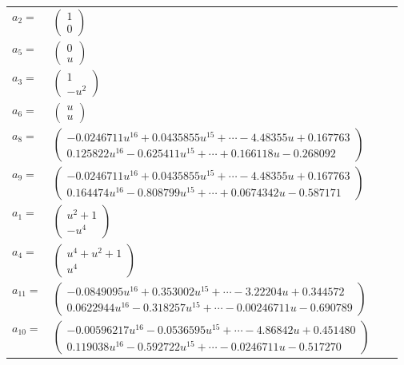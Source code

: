 \documentclass[1p]{elsarticle_modified}
\theoremstyle{definition}
\begin{document}
\begin{tabular}{m{7pt} m{180pt} m{7pt} m{180pt} }
\flushright $a_{2}=$&$\begin{pmatrix}1\\0\end{pmatrix}$ \\
\flushright $a_{5}=$&$\begin{pmatrix}0\\u\end{pmatrix}$ \\
\flushright $a_{3}=$&$\begin{pmatrix}1\\- u^2\end{pmatrix}$ \\
\flushright $a_{6}=$&$\begin{pmatrix}u\\u\end{pmatrix}$ \\
\flushright $a_{8}=$&$\begin{pmatrix}-0.0246711 u^{16}+0.0435855 u^{15}+\cdots-4.48355 u+0.167763\\0.125822 u^{16}-0.625411 u^{15}+\cdots+0.166118 u-0.268092\end{pmatrix}$ \\
\flushright $a_{9}=$&$\begin{pmatrix}-0.0246711 u^{16}+0.0435855 u^{15}+\cdots-4.48355 u+0.167763\\0.164474 u^{16}-0.808799 u^{15}+\cdots+0.0674342 u-0.587171\end{pmatrix}$ \\
\flushright $a_{1}=$&$\begin{pmatrix}u^2+1\\- u^4\end{pmatrix}$ \\
\flushright $a_{4}=$&$\begin{pmatrix}u^4+u^2+1\\u^4\end{pmatrix}$ \\
\flushright $a_{11}=$&$\begin{pmatrix}-0.0849095 u^{16}+0.353002 u^{15}+\cdots-3.22204 u+0.344572\\0.0622944 u^{16}-0.318257 u^{15}+\cdots-0.00246711 u-0.690789\end{pmatrix}$ \\
\flushright $a_{10}=$&$\begin{pmatrix}-0.00596217 u^{16}-0.0536595 u^{15}+\cdots-4.86842 u+0.451480\\0.119038 u^{16}-0.592722 u^{15}+\cdots-0.0246711 u-0.517270\end{pmatrix}$ \\

\end{tabular}
\end{document}

